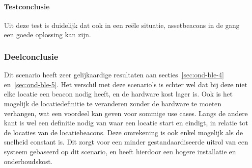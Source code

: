 \paragraph{Testconclusie}
Uit deze test is duidelijk dat ook in een reële situatie, assetbeacons in de gang een goede oplossing kan zijn.

\subsubsection{Deelconclusie}
Dit scenario heeft zeer gelijkaardige resultaten aan secties~\ref{sec:ond-ble-4} en~\ref{sec:ond-ble-5}. Het verschil met deze scenario's is echter wel dat bij deze niet elke locatie een beacon nodig heeft, en de hardware kost lager is. Ook is het mogelijk de locatiedefinitie te veranderen zonder de hardware te moeten verhangen, wat een voordeel kan geven voor sommige use cases. Langs de andere kant is wel een definitie nodig van waar een locatie start en eindigt, in relatie tot de locaties van de locatiebeacons. Deze omrekening is ook enkel mogelijk als de snelheid constant is. Dit zorgt voor een minder gestandaardiseerde uitrol van een systeem gebaseerd op dit scenario, en heeft hierdoor een hogere installatie en onderhoudskost.
